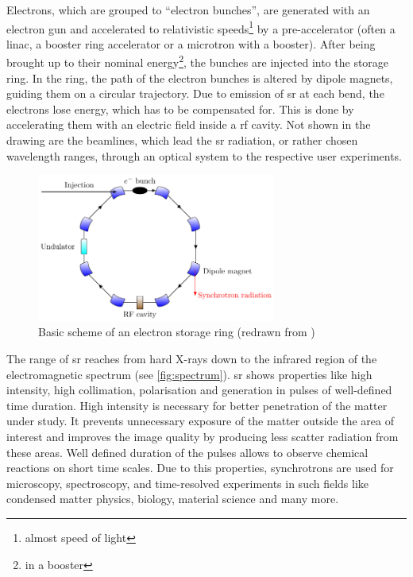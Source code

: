 Electrons, which are grouped to ``electron bunches'', are generated with an electron gun and accelerated to relativistic speeds\footnote{almost speed of light} by a pre-accelerator (often a \gls{linac}, a booster ring accelerator or a microtron with a booster). 
After being brought up to their nominal energy\footnote{in a booster}, the bunches are injected into the storage ring.
In the ring, the path of the electron bunches is altered by dipole magnets, guiding them on a circular trajectory. %
Due to emission of \gls{sr} at each bend, the electrons lose energy, which has to be compensated for.
This is done by accelerating them with an electric field inside a \gls{rf} cavity.
Not shown in the drawing are the beamlines, which lead the \gls{sr} radiation, or rather chosen wavelength ranges, through an optical system to the respective user experiments. \cite{roussel2014,rota2018}

\begin{figure}[tb]
	\centering
	\includegraphics[width=0.7\textwidth]{chap/02-theory/img/bd/synchrotron.pdf}
	\caption{Basic scheme of an electron storage ring (redrawn from \cite{roussel2014})}
	\label{fig:storageRing}
\end{figure}

The range of \gls{sr} reaches from hard X-rays down to the infrared region of the electromagnetic spectrum (see \autoref{fig:spectrum}). \Gls{sr} shows properties like high intensity, high collimation, polarisation and generation in pulses of well-defined time duration.
High intensity is necessary for better penetration of the matter under study.
It prevents unnecessary exposure of the matter outside the area of interest and improves the image quality by producing less scatter radiation from these areas.
Well defined duration of the pulses allows to observe chemical reactions on short time scales.
Due to this properties, synchrotrons are used for microscopy, spectroscopy, and time-resolved experiments in such fields like condensed matter physics, biology, material science and many more.

